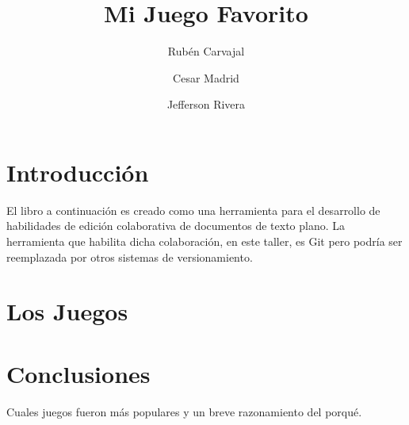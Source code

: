 \documentclass[12pt,oneside]{book}
\title{Mi Juego Favorito}
\author{Rubén Carvajal\\
\and
Cesar Madrid\\
\and
Jefferson Rivera}
\begin{document}
\maketitle
\tableofcontents

\chapter{Introducción}
El libro a continuación es creado como una herramienta para el desarrollo de habilidades de edición colaborativa de documentos de texto plano. La herramienta que habilita dicha colaboración, en este taller, es Git pero podría ser reemplazada por otros sistemas de versionamiento.

\chapter{Los Juegos}








\chapter{Conclusiones}
Cuales juegos fueron más populares y un breve razonamiento del porqué.
\end{document}
